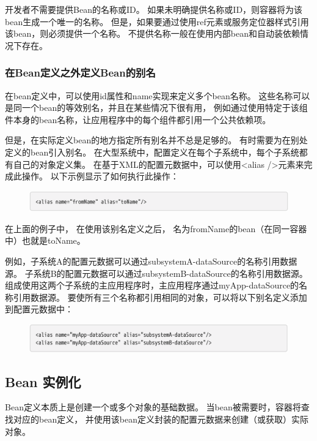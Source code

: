 开发者不需要提供Bean的名称或ID。 
如果未明确提供名称或ID，则容器将为该bean生成一个唯一的名称。 
但是，如果要通过使用ref元素或服务定位器样式引用该bean，则必须提供一个名称。
不提供名称一般在使用内部bean和自动装依赖情况下存在。


\subsubsection{在Bean定义之外定义Bean的别名}
在bean定义中，可以使用id属性和name实现来定义多个bean名称。
这些名称可以是同一个bean的等效别名，并且在某些情况下很有用，
例如通过使用特定于该组件本身的bean名称，让应用程序中的每个组件都引用一个公共依赖项。

但是，在实际定义bean的地方指定所有别名并不总是足够的。 
有时需要为在别处定义的bean引入别名。 
在大型系统中，配置定义在每个子系统中，每个子系统都有自己的对象定义集。 
在基于XML的配置元数据中，可以使用<alias />元素来完成此操作。 
以下示例显示了如何执行此操作：

\begin{figure}[ht]
    \centering
    \includegraphics[width=1\linewidth]{./Figure/IMG_code_12.png}
\end{figure}
在上面的例子中，
在使用该别名定义之后，
名为fromName的bean（在同一容器中）也就是toName。

例如，子系统A的配置元数据可以通过subsystemA-dataSource的名称引用数据源。 
子系统B的配置元数据可以通过subsystemB-dataSource的名称引用数据源。 
组成使用这两个子系统的主应用程序时，主应用程序通过myApp-dataSource的名称引用数据源。
要使所有三个名称都引用相同的对象，可以将以下别名定义添加到配置元数据中：

\begin{figure}[ht]
    \centering
    \includegraphics[width=1\linewidth]{./Figure/IMG_code_13.png}
\end{figure}

\subsection{Bean 实例化}
Bean定义本质上是创建一个或多个对象的基础数据。 
当bean被需要时，容器将查找对应的bean定义，
并使用该bean定义封装的配置元数据来创建（或获取）实际对象。

